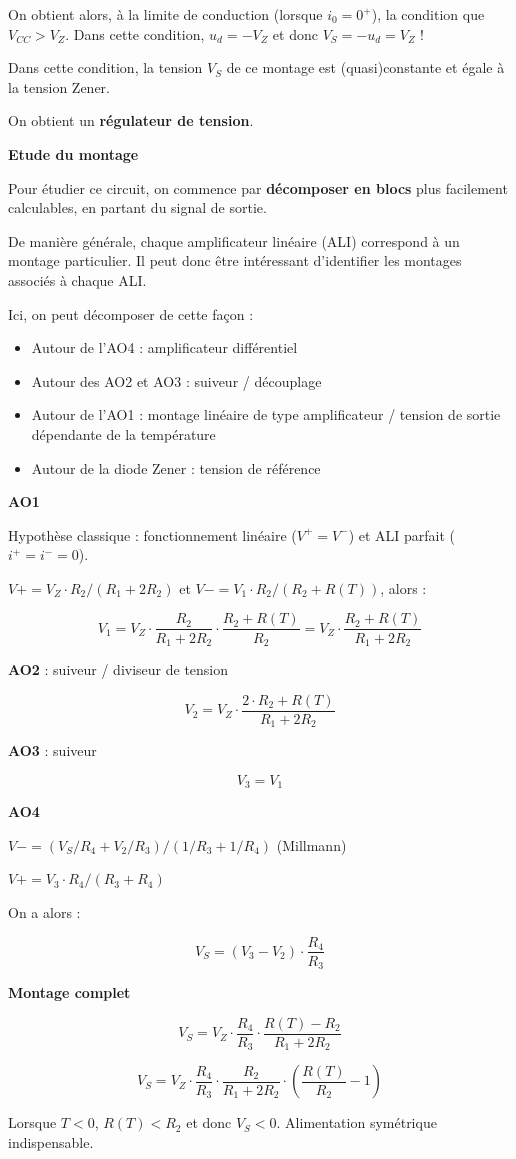 \documentclass[a4paper,french]{paper}
\begin{document}
On obtient alors, à la limite de conduction (lorsque $i_0 = 0^+$), la condition que $V_{CC} > V_Z$. Dans cette condition, $u_d = -V_Z$ et donc $V_S = -u_d = V_Z$ !

Dans cette condition, la tension $V_S$ de ce montage est (quasi)constante et égale à la tension Zener.

On obtient un \textbf{régulateur de tension}.


\textbf{Etude du montage}

Pour étudier ce circuit, on commence par \textbf{décomposer en blocs} plus facilement calculables, en partant du signal de sortie.

De manière générale, chaque amplificateur linéaire (ALI) correspond à un montage particulier. Il peut donc être intéressant d'identifier les montages associés à chaque ALI.

Ici, on peut décomposer de cette façon : 
\begin{itemize}
	\item Autour de l'AO4 : amplificateur différentiel 
	\item Autour des AO2 et AO3 : suiveur / découplage
	\item Autour de l'AO1 : montage linéaire de type amplificateur / tension de sortie dépendante de la température
	\item Autour de la diode Zener : tension de référence	
\end{itemize}


\textbf{AO1} 

Hypothèse classique : fonctionnement linéaire ($V^+ = V^-$) et ALI parfait ($i^+ = i^- = 0$).

$V+ = V_Z \cdot R_2 / (R_1 + 2 R_2)$ et $V- = V_1 \cdot R_2 / (R_2 + R(T))$, alors : 

$$V_1 = V_Z \cdot \frac{R_2}{R_1 + 2 R_2} \cdot \frac{R_2 + R(T)}{R_2} = V_Z \cdot \frac{R_2 + R(T)}{R_1 + 2 R_2}$$

\textbf{AO2} : suiveur / diviseur de tension

$$V_2 =  V_Z \cdot \frac{2 \cdot R_2 + R(T)}{R_1 + 2 R_2}$$

\textbf{AO3} : suiveur

$$V_3 = V_1$$

\textbf{AO4} 

$V- = (V_S/R_4 + V_2/R_3) / (1/R_3 + 1/R_4)$ (Millmann)

$V+ = V_3 \cdot R_4 / (R_3 + R_4)$

On a alors : 

$$V_S = (V_3 - V_2) \cdot \frac{R_4}{R_3}$$


\textbf{Montage complet}

$$V_S = V_Z \cdot \frac{R_4}{R_3} \cdot \frac{R(T) - R_2}{R_1 + 2 R_2}$$

$$V_S = V_Z \cdot \frac{R_4}{R_3} \cdot \frac{R_2}{R_1 + 2 R_2} \cdot (\frac{R(T)}{R_2} - 1)$$


Lorsque $T < 0$, $R(T) < R_2$ et donc $V_S < 0$. Alimentation symétrique indispensable.




\end{document}
